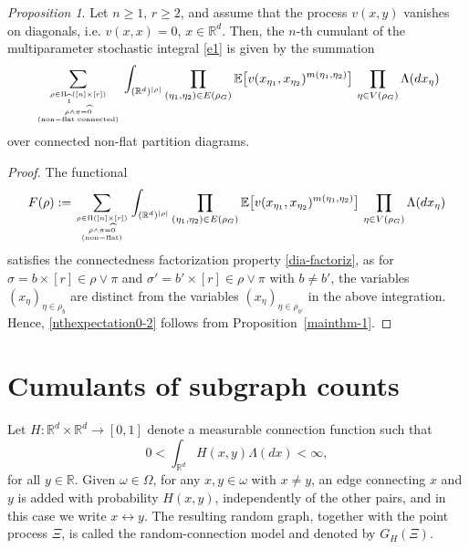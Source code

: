\documentclass[bj,authoryear,noshowframe]{imsart}
\theoremstyle{plain}
\theoremstyle{remark}
\newcommand{\E}{\mathbb{E}}
\newcommand{\R}{\mathbb{R}}
\def\real{{\mathord{\mathbb R}}}
\newtheorem{prop}{Proposition}[section]
\begin{document}
 \begin{prop}
 \label{p01-1} 
 Let $n \geq 1$, $r \geq 2$, and assume that the process $v(x,y)$ vanishes
 on diagonals, i.e. $v(x,x) = 0$, $x\in \real^d$. 
 Then, the $n$-th cumulant of the multiparameter stochastic integral
  \eqref{e1} is given by the summation 
 \begin{equation}
   \label{nthexpectation0-2}
   \sum_{\rho \in \Pi_{\widehat{1}} ( [n] \times [r])
     \atop
     {\rho \wedge \pi = \widehat{0}
     \atop {\rm (non-flat \ \! connected)}
     }
     }
     \int_{(\R^d )^{|\rho |}}
       \prod_{(\eta_1,\eta_2) \in E(\rho_G)}
   \E \big[ v (x_{\eta_1},x_{\eta_2})^{m({\eta_1,\eta_2})} \big] 
  \ \! \prod_{\eta \in V(\rho_G)}
 \Lambda(dx_\eta )
 \end{equation}
 over connected non-flat partition diagrams.
 \end{prop}
 \begin{proof}
  The functional 
 \begin{equation}
 \nonumber %
 F(\rho ):=
 \sum_{\rho \in \Pi ( [n] \times [r] )
 \atop {
     \rho \wedge \pi = \widehat{0}
     \atop
         {\rm (non-flat)}
 }
 }
 \int_{(\R^d )^{|\rho |}}
   \prod_{(\eta_1,\eta_2) \in E(\rho_G)}
  \E \big[ v(x_{\eta_1},x_{\eta_2})^{m({\eta_1,\eta_2})} \big] 
    \ \! \prod_{\eta \in V(\rho_G)}
 \Lambda(dx_\eta )
 \end{equation}
  satisfies the connectedness factorization property
  \eqref{dia-factoriz}, as for
  $\sigma = b \times [r] \in \rho \vee \pi$ and
  $\sigma' = b' \times [r] \in \rho \vee \pi$
  with $b \not= b'$, the variables $(x_\eta )_{\eta \in \rho_b}$
  are distinct from the variables $(x_\eta )_{\eta \in \rho_{b'}}$
  in the above integration. 
  Hence, \eqref{nthexpectation0-2} follows from Proposition~\ref{mainthm-1}. 
 \end{proof}
 \vspace{-0.1cm}
 \section{Cumulants of subgraph counts} %
 \label{s5}
 \vspace{-0.1cm}
 \noindent
  Let 
  $H:\R^d\times\R^d\to[0,1]$ 
  denote a %
  measurable connection function such that
  \begin{equation}
  \nonumber %
 0<\int_{\real^d}H(x,y) \Lambda(dx)< \infty, 
 \end{equation}
  for all $y \in\R$. 
  Given $\omega \in \Omega$, for any $x,y\in\omega$ with $x\not= y$,
  an edge connecting $x$ and $y$ is added with probability $H(x,y)$,
  independently of the other pairs, and in this case we write $x \leftrightarrow y$.
  The resulting random graph, together with the point process $\Xi$,
  is called the random-connection model and denoted by $G_H(\Xi)$.
 
\end{document}
